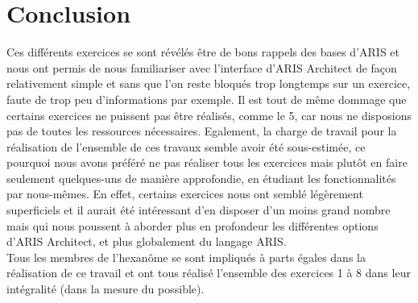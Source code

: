 \section{Conclusion}

Ces différents exercices se sont révélés être de bons rappels des bases d'ARIS et nous ont permis de nous familiariser avec l'interface d'ARIS Architect de façon relativement simple et sans que l’on reste bloqués trop longtemps sur un exercice, faute de trop peu d'informations par exemple. Il est tout de même dommage que certains exercices ne puissent pas être réalisés, comme le 5, car nous ne disposions pas de toutes les ressources nécessaires. Egalement, la charge de travail pour la réalisation de l'ensemble de ces travaux semble avoir été sous-estimée, ce pourquoi nous avons préféré ne pas réaliser tous les exercices mais plutôt en faire seulement quelques-uns de manière approfondie, en étudiant les fonctionnalités par nous-mêmes. En effet, certains exercices nous ont semblé légèrement superficiels et il aurait été intéressant d'en disposer d'un moins grand nombre mais qui nous poussent à aborder plus en profondeur les différentes options d'ARIS Architect, et plus globalement du langage ARIS. \\

Tous les membres de l'hexanôme se sont impliqués à parts égales dans la réalisation de ce travail et ont tous réalisé l'ensemble des exercices 1 à 8 dans leur intégralité (dans la mesure du possible).